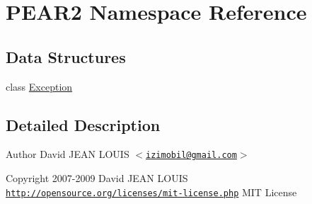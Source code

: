 \hypertarget{namespace_p_e_a_r2}{
\section{\-P\-E\-A\-R2 \-Namespace \-Reference}
\label{namespace_p_e_a_r2}
}
\subsection*{\-Data \-Structures}
\begin{DoxyCompactItemize}
\item 
class \hyperlink{class_p_e_a_r2_1_1_exception}{\-Exception}
\end{DoxyCompactItemize}


\subsection{\-Detailed \-Description}
\begin{DoxyAuthor}{\-Author}
\-David \-J\-E\-A\-N \-L\-O\-U\-I\-S $<$\href{mailto:izimobil@gmail.com}{\tt izimobil@gmail.\-com}$>$ 
\end{DoxyAuthor}
\begin{DoxyCopyright}{\-Copyright}
2007-\/2009 \-David \-J\-E\-A\-N \-L\-O\-U\-I\-S  \href{http://opensource.org/licenses/mit-license.php}{\tt http\-://opensource.\-org/licenses/mit-\/license.\-php} \-M\-I\-T \-License 
\end{DoxyCopyright}
